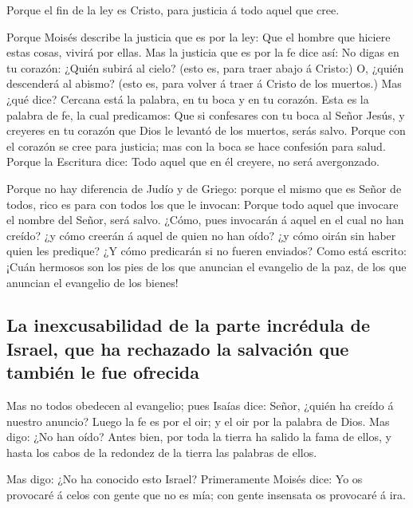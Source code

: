  Porque el fin de la ley es Cristo, para justicia á todo
aquel que cree.

 Porque Moisés describe la justicia que es por la ley: Que
el hombre que hiciere estas cosas, vivirá por ellas.  Mas la
justicia que es por la fe dice así: No digas en tu corazón: ¿Quién
subirá al cielo? (esto es, para traer abajo á Cristo:)  O,
¿quién descenderá al abismo? (esto es, para volver á traer á Cristo de
los muertos.)  Mas ¿qué dice? Cercana está la palabra, en tu
boca y en tu corazón. Esta es la palabra de fe, la cual predicamos:
 Que si confesares con tu boca al Señor Jesús, y creyeres en
tu corazón que Dios le levantó de los muertos, serás salvo.
 Porque con el corazón se cree para justicia; mas con la
boca se hace confesión para salud.  Porque la Escritura
dice: Todo aquel que en él creyere, no será avergonzado.

 Porque no hay diferencia de Judío y de Griego: porque el
mismo que es Señor de todos, rico es para con todos los que le invocan:
 Porque todo aquel que invocare el nombre del Señor, será
salvo.  ¿Cómo, pues invocarán á aquel en el cual no han
creído? ¿y cómo creerán á aquel de quien no han oído? ¿y cómo oirán sin
haber quien les predique?  ¿Y cómo predicarán si no fueren
enviados? Como está escrito: ¡Cuán hermosos son los pies de los que
anuncian el evangelio de la paz, de los que anuncian el evangelio de los
bienes!

\hypertarget{la-inexcusabilidad-de-la-parte-incruxe9dula-de-israel-que-ha-rechazado-la-salvaciuxf3n-que-tambiuxe9n-le-fue-ofrecida}{%
\subsection{La inexcusabilidad de la parte incrédula de Israel, que ha
rechazado la salvación que también le fue
ofrecida}\label{la-inexcusabilidad-de-la-parte-incruxe9dula-de-israel-que-ha-rechazado-la-salvaciuxf3n-que-tambiuxe9n-le-fue-ofrecida}}

 Mas no todos obedecen al evangelio; pues Isaías dice:
Señor, ¿quién ha creído á nuestro anuncio?  Luego la fe es
por el oir; y el oir por la palabra de Dios.  Mas digo: ¿No
han oído? Antes bien, por toda la tierra ha salido la fama de ellos, y
hasta los cabos de la redondez de la tierra las palabras de ellos.

 Mas digo: ¿No ha conocido esto Israel? Primeramente Moisés
dice: Yo os provocaré á celos con gente que no es mía; con gente
insensata os provocaré á ira.

